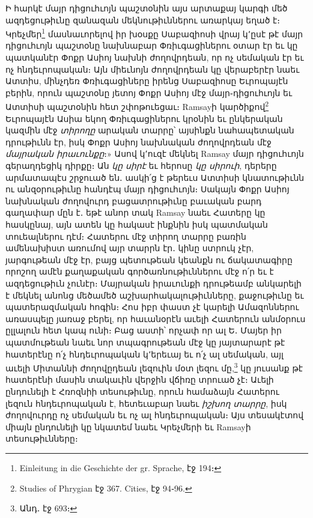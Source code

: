 \documentclass{article}
\begin{document}
{Ի հարկէ մայր դիցուհւոյն պաշտօնին այս արտաքայ կարգի մեծ ազդեցութիւնը զանազան մեկնութիւններու առարկայ եղած է։ Կրեչմեր\footnote{Einleitung in die Geschichte der gr. Sprache, էջ 194։} մասնաւորելով իր խօսքը Սաբազիոսի վրայ կ՚ըսէ թէ մայր դիցուհւոյն պաշտօնը նախնաբար Փռիւգացիներու օտար էր եւ կը պատկանէր Փոքր Ասիոյ նախնի ժողովրդեան, որ ոչ սեմական էր եւ ոչ հնդեւրոպական։ Այն միեւնոյն ժողովրդեան կը վերաբերէր նաեւ Ատտիս, մինչդեռ Փռիւգացիները իրենց Սաբազիոսը Եւրոպայէն բերին, որուն պաշտօնը յետոյ Փոքր Ասիոյ մէջ մայր֊դիցուհւոյն եւ Ատտիսի պաշտօնին հետ շփոթուեցաւ։ Ramsayի կարծիքով\footnote{Studies of Phrygian էջ 367. Cities, էջ 94֊96.} Եւրոպայէն Ասիա եկող Փռիւգացիներու կրօնին եւ ընկերական կազմին մէջ \emph{տիրողը} արական տարրը՝ այսինքն նահապետական դրութիւնն էր, իսկ Փոքր Ասիոյ նախնական ժողովրդեան մէջ \emph{մայրական իրաւունքը}։» Ասով կ՚ուզէ մեկնել Ramsay մայր դիցուհւոյն գերաղդեցիկ դիրքը։ Ան \emph{կը սիրէ} եւ հերոսը \emph{կը սիրուի}, դերերը արմատապէս շրջուած են․ ասկի՛ց է թերեւս Ատտիսի կնատութիւնն ու անզօրութիւնը հանդէպ մայր դիցուհւոյն։ Սակայն Փոքր Ասիոյ նախնական ժողովուրդ բացատրութիւնը բաւական բարդ գաղափար մըն է․ եթէ անոր տակ Ramsay նաեւ Հատերը կը հասկընայ, այն ատեն կը հակասէ ինքնին իսկ պատմական տուեալներու դէմ։ Հատերու մէջ տիրող տարրը բառին ամենախիստ առումով այր տարրն էր․ կինը ստրուկ չէր, յարգութեան մէջ էր, բայց պետութեան կեանքն ու ճակատագիրը որոշող ամէն քաղաքական գործառնութիւններու մէջ ո՛ր եւ է ազդեցութիւն չունէր։ Մայրական իրաւունքի դրութեամբ անկարելի է մեկնել անոնց մեծամեծ աշխարհակալութիւնները, քաջութիւնը եւ պատերազմական հոգին։ Հոս իբր փաստ չէ կարելի Ամազոններու առասպելը յառաջ բերել, որ հաւանօրէն աւելի Հատերուն անմօրուս ըլլալուն հետ կապ ունի։ Բաց աստի՝ որչափ որ ալ Ե․ Մայեր իր պատմութեան նաեւ նոր տպագրութեան մէջ կը յայտարարէ թէ հատերէնը ո՛չ հնդեւրոպական կ՚երեւայ եւ ո՛չ ալ սեմական, այլ աւելի Միտաննի ժողովըդեան լեզուին մօտ լեզու մը,\footnote{Անդ․ էջ 693։} կը յուսանք թէ հատերէնի մասին տակաւին վերջին վճիռը տրուած չէ։ Աւելի ընդունելի է Հռոզնիի տեսութիւնը, որուն համաձայն Հատերու լեզուն հնդեւրոպական է, հետեւաբար նաեւ \emph{իշխող տարրը}, իսկ ժողովուրդը ոչ սեմական եւ ոչ ալ հնդեւրոպական։ Այս տեսակէտով միայն ընդունելի կը նկատեմ նաեւ Կրեչմերի եւ Ramsayի տեսութիւնները։

}
\end{document}

